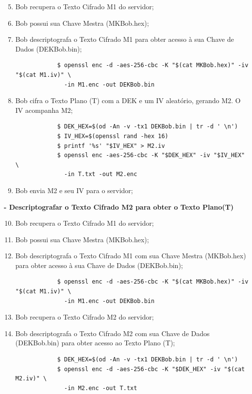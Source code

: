 \documentclass{article}
\begin{document}
\begin{enumerate}
	\setcounter{enumi}{4} %
	\item Bob recupera o Texto Cifrado M1 do servidor;
	\item Bob possui sua Chave Mestra (MKBob.hex);
	\item Bob descriptografa o Texto Cifrado M1 para obter acesso à sua Chave de Dados (DEKBob.bin);
	\begin{tcolorbox}[width=\textwidth]
		{\scriptsize
			\begin{verbatim}
			$ openssl enc -d -aes-256-cbc -K "$(cat MKBob.hex)" -iv "$(cat M1.iv)" \
			  -in M1.enc -out DEKBob.bin
			\end{verbatim}
		}
	\end{tcolorbox}
	\item Bob cifra o Texto Plano (T) com a DEK e um IV aleatório, gerando M2. O IV acompanha M2;
	\begin{tcolorbox}[width=\textwidth]
		{\small
			\begin{verbatim}
			$ DEK_HEX=$(od -An -v -tx1 DEKBob.bin | tr -d ' \n')
			$ IV_HEX=$(openssl rand -hex 16)
			$ printf '%s' "$IV_HEX" > M2.iv
			$ openssl enc -aes-256-cbc -K "$DEK_HEX" -iv "$IV_HEX" \
			  -in T.txt -out M2.enc
			\end{verbatim}
		}
	\end{tcolorbox}
	\item Bob envia M2 e seu IV para o servidor;
\end{enumerate}

\textbf{- Descriptografar o Texto Cifrado M2 para obter o Texto Plano(T)}

\begin{enumerate}
	\setcounter{enumi}{9} %
	\item Bob recupera o Texto Cifrado M1 do servidor;
	\item Bob possui sua Chave Mestra (MKBob.hex);
	\item Bob descriptografa o Texto Cifrado M1 com sua Chave Mestra (MKBob.hex) para obter acesso à sua Chave de Dados (DEKBob.bin);
	\begin{tcolorbox}[width=\textwidth]
		{\scriptsize
			\begin{verbatim}
			$ openssl enc -d -aes-256-cbc -K "$(cat MKBob.hex)" -iv "$(cat M1.iv)" \
			  -in M1.enc -out DEKBob.bin
			\end{verbatim}
		}
	\end{tcolorbox}
	\item Bob recupera o Texto Cifrado M2 do servidor;
	\item Bob descriptografa o Texto Cifrado M2 com sua Chave de Dados (DEKBob.bin) para obter acesso ao Texto Plano (T);
	\begin{tcolorbox}[width=\textwidth]
		{\small
			\begin{verbatim}
			$ DEK_HEX=$(od -An -v -tx1 DEKBob.bin | tr -d ' \n')
			$ openssl enc -d -aes-256-cbc -K "$DEK_HEX" -iv "$(cat M2.iv)" \
			  -in M2.enc -out T.txt
			\end{verbatim}
		}
	\end{tcolorbox}
\end{enumerate}
\end{document}
